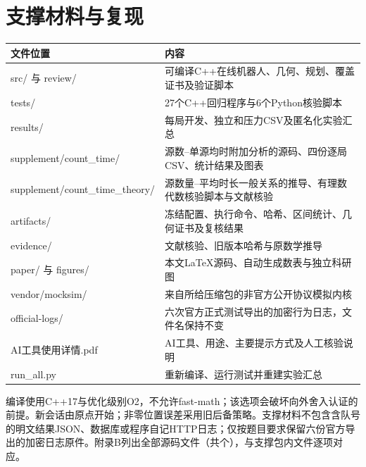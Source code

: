 \documentclass[UTF8,a4paper,zihao=-4,fontset=fandol]{ctexart}
\begin{document}
\section{支撑材料与复现}
\begin{longtable}{>{\raggedright\arraybackslash}p{5.0cm}>{\raggedright\arraybackslash}p{7.9cm}}\toprule 文件位置&内容\\\midrule\endhead
src/ 与 review/ & 可编译C++在线机器人、几何、规划、覆盖证书及验证脚本\\
tests/ & 27个C++回归程序与6个Python核验脚本\\
results/ & 每局开发、独立和压力CSV及匿名化实验汇总\\
supplement/count\_time/ & 源数--单源均时附加分析的源码、四份逐局CSV、统计结果及图表\\
supplement/\allowbreak count\_time\_theory/ & 源数量--平均时长一般关系的推导、有理数代数核验脚本与文献核验\\
artifacts/ & 冻结配置、执行命令、哈希、区间统计、几何证书及复核结果\\
evidence/ & 文献核验、旧版本哈希与原数学推导\\
paper/ 与 figures/ & 本文LaTeX源码、自动生成数表与独立科研图\\
vendor/mocksim/ & 来自所给压缩包的非官方公开协议模拟内核\\
official-logs/ & 六次官方正式测试导出的加密行为日志，文件名保持不变\\
AI工具使用详情.pdf & AI工具、用途、主要提示方式及人工核验说明\\
run\_all.py & 重新编译、运行测试并重建实验汇总\\\bottomrule\end{longtable}
编译使用C++17与优化级别O2，不允许fast-math；该选项会破坏向外舍入认证的前提。新会话由原点开始；非零位置误差采用旧后备策略。支撑材料不包含含队号的明文结果JSON、数据库或程序自记HTTP日志；仅按题目要求保留六份官方导出的加密日志原件。附录B列出全部源码文件（共\SourceFileCount{}个），与支撑包内文件逐项对应。

\end{document}
